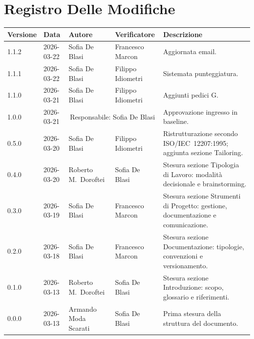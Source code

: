 \section*{Registro Delle Modifiche}

\renewcommand{\arraystretch}{1.5}
\begin{longtable}{>{\ttfamily\small}l l l l p{5cm}}
  \toprule
  \textbf{Versione} & \textbf{Data} & \textbf{Autore}
    & \textbf{Verificatore} & \textbf{Descrizione} \\
  \midrule
  \endhead
  1.1.2 & 2026-03-22 & Sofia De Blasi & Francesco Marcon
    & Aggiornata email. \\[4pt]
  1.1.1 & 2026-03-22 & Sofia De Blasi & Filippo Idiometri
    & Sistemata punteggiatura. \\[4pt]
  1.1.0 & 2026-03-21 & Sofia De Blasi & Filippo Idiometri
    & Aggiunti pedici G. \\[4pt]
  1.0.0 & 2026-03-21 & \multicolumn{2}{c}{Responsabile: Sofia De Blasi}
    & Approvazione ingresso in baseline. \\[4pt]
  0.5.0 & 2026-03-20 & Sofia De Blasi       & Filippo Idiometri
    & Ristrutturazione secondo ISO/IEC~12207:1995; aggiunta sezione Tailoring. \\[4pt]
  0.4.0 & 2026-03-20 & Roberto M.\ Doroftei & Sofia De Blasi
    & Stesura sezione Tipologia di Lavoro: modalità decisionale e brainstorming. \\[4pt]
  0.3.0 & 2026-03-19 & Sofia De Blasi       & Francesco Marcon
    & Stesura sezione Strumenti di Progetto: gestione, documentazione e comunicazione. \\[4pt]
  0.2.0 & 2026-03-18 & Sofia De Blasi       & Francesco Marcon
    & Stesura sezione Documentazione: tipologie, convenzioni e versionamento. \\[4pt]
  0.1.0 & 2026-03-13 & Roberto M.\ Doroftei & Sofia De Blasi
    & Stesura sezione Introduzione: scopo, glossario e riferimenti. \\[4pt]
  0.0.0 & 2026-03-13 & Armando Moda Scarati & Sofia De Blasi
    & Prima stesura della struttura del documento. \\
  \bottomrule
\end{longtable}